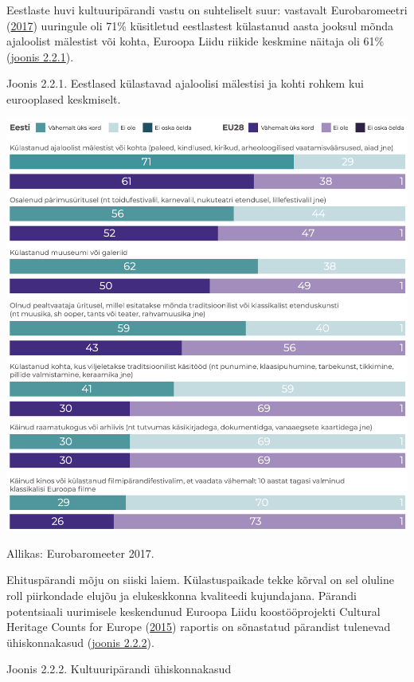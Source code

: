 \documentclass[estonian,]{article}
\begin{document}
Eestlaste huvi kultuuripärandi vastu on suhteliselt suur: vastavalt Eurobaromeetri (\href{Eurobarometer2017}{2017}) uuringule oli 71\% küsitletud eestlastest külastanud aasta jooksul mõnda ajaloolist mälestist või kohta, Euroopa Liidu riikide keskmine näitaja oli 61\% (\protect\hyperlink{figure221}{joonis 2.2.1}).

{Joonis 2.2.1.} Eestlased külastavad ajaloolisi mälestisi ja kohti rohkem kui eurooplased keskmiselt.

\begin{center}\includegraphics[width=0.9\linewidth]{figures/2-chapter/fig221} \end{center}

\begin{imgsource}
{Allikas:} Eurobaromeeter 2017.
\end{imgsource}

Ehituspärandi mõju on siiski laiem. Külastuspaikade tekke kõrval on sel oluline roll piirkondade elujõu ja elukeskkonna kvaliteedi kujundajana. Pärandi potentsiaali uurimisele keskendunud Euroopa Liidu koostööprojekti Cultural Heritage Counts for Europe (\protect\hyperlink{Cultural2015}{2015}) raportis on sõnastatud pärandist tulenevad ühiskonnakasud (\protect\hyperlink{figure222}{joonis 2.2.2}).

{Joonis 2.2.2.} Kultuuripärandi ühiskonnakasud
\end{document}
